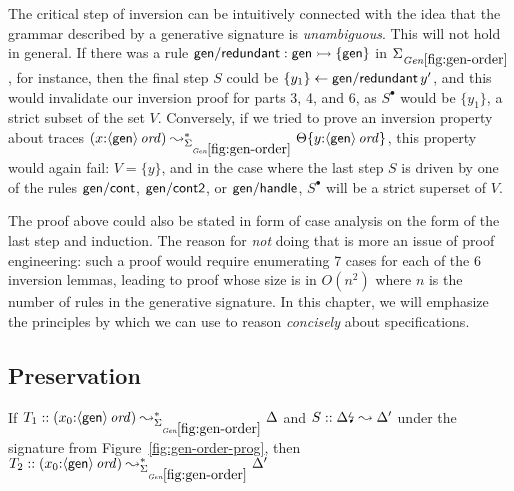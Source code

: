 The critical step of inversion can be intuitively connected with the
idea that the grammar described by a generative signature is {\it
  unambiguous}. This will not hold in general. If there was
a rule ${\sf gen/redundant} : {\sf gen} \rightarrowtail \{ {\sf gen} \}$ in
$\Sigma_{\it Gen\ref{fig:gen-order}}$, for instance, then the final
step $S$ could be
$\{{y_1}\} \leftarrow {{\sf gen/redundant}\,y'}$, and this would invalidate our
inversion proof
for parts 3, 4, and 6, as $S^{\bullet}$ would be $\{y_1\}$, a strict
subset of the set $V$. 
Conversely, if we tried to prove an inversion
property about traces $(x{:}\istrue{\susp{\sf gen}})
\leadsto^*_{\siggenorder} \tackon{\Theta}{y{:}\istrue{\susp{{\sf
        gen}}}}$, this property would again fail: $V = \{ y
\}$, and in the case where the last step $S$ is driven by one of the
rules ${\sf gen/cont}$, ${\sf gen/cont2}$, or ${\sf gen/handle}$,
$S^{\bullet}$ will be a strict superset of $V$.

The proof above could also be stated in form of case analysis on the
form of the last step and induction. The reason for {\it not} doing
that is more an issue of proof engineering: such a proof would require
enumerating 7 cases for each of the 6 inversion lemmas, leading to
proof whose size is in $O(n^2)$ where $n$ is the number of rules
in the generative signature. In this chapter, we will emphasize the principles
by which we can use to reason {\it concisely} about specifications.

\subsection{Preservation}

\begin{theorem}\label{thm:siggenorder}
If $T_1 :: (x_0{:}\istrue{\susp{\sf gen}}) \leadsto^*_{\siggenorder} 
   \Delta$ and $S :: {\Delta}{\mbox{\lightning}}_{} \leadsto \Delta'$
under the signature from Figure~\ref{fig:gen-order-prog}, then
$T_2 :: (x_0{:}\istrue{\susp{\sf gen}}) \leadsto^*_{\siggenorder} 
   \Delta'$
\end{theorem}


